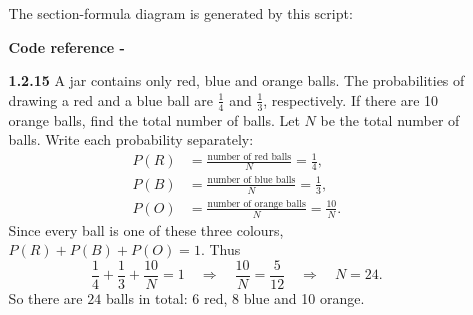 \begin{enumerate}[label={},leftmargin=0pt]
\begin{enumerate}[label={},leftmargin=0pt,itemsep=9pt]
The section-formula diagram is generated by this script:
\par\smallskip
\noindent\textbf{Code reference -}
\par\noindent{}
\par\smallskip
\setcounter{enumii}{15}
\setcounter{equation}{0}
\item[\textbf{1.2.15}] A jar contains only red, blue and orange balls. The probabilities of drawing a red and a blue ball are $\frac14$ and $\frac13$, respectively. If there are 10 orange balls, find the total number of balls.
\solution Let $N$ be the total number of balls. Write each probability separately:
\begin{align}
P(R)&=\frac{\text{number of red balls}}{N}=\frac14,\\
P(B)&=\frac{\text{number of blue balls}}{N}=\frac13,\\
P(O)&=\frac{\text{number of orange balls}}{N}=\frac{10}{N}.
\end{align}
Since every ball is one of these three colours, $P(R)+P(B)+P(O)=1$. Thus
\begin{equation}
\frac14+\frac13+\frac{10}{N}=1\quad\Longrightarrow\quad\frac{10}{N}=\frac5{12}\quad\Longrightarrow\quad N=24.
\end{equation}
So there are $24$ balls in total: 6 red, 8 blue and 10 orange.




\end{enumerate}
\end{enumerate}
